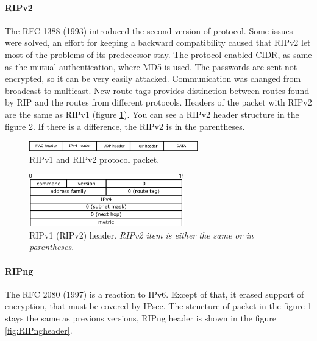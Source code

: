 \documentclass[10pt,a4paper,titlepage]{article}
\begin{document}
            \paragraph{RIPv2}
                The RFC 1388 (1993) introduced the second version of protocol. Some issues were solved, an effort for keeping
                a backward compatibility caused that RIPv2 let most of the problems of its predecessor stay. The protocol
                enabled CIDR, as same as the mutual authentication, where MD5 is used. The passwords are sent not encrypted,
                so it can be very easily attacked. Communication was changed from broadcast to multicast. New route tags
                provides distinction between routes found by RIP and the routes from different protocols. Headers of the packet
                with RIPv2 are the same as RIPv1 (figure \ref{fig:RIPheaders}). You can see a RIPv2 header structure in the figure
                \ref{fig:RIPheader}. If there is a difference, the RIPv2 is in the parentheses. \cite{RFC2453}

                \begin{figure}[h!]
                    \begin{center}
                        \includegraphics[width=0.65\textwidth]{rip_hs.png}
                        \caption{RIPv1 and RIPv2 protocol packet. \label{fig:RIPheaders}}
                    \end{center}
                \end{figure}

                \begin{figure}[h!]
                    \begin{center}
                        \includegraphics[width=0.60\textwidth]{rip_h.png}
                        \caption{RIPv1 (RIPv2) header. {\it RIPv2 item is either the same or in parentheses}. \label{fig:RIPheader}}
                    \end{center}
                \end{figure}

            \paragraph{RIPng}
                The RFC 2080 (1997) is a reaction to IPv6. Except of that, it erased support of encryption, that must be covered
                by IPsec. The structure of packet in the figure \ref{fig:RIPheaders} stays the same as previous versions,
                RIPng header is shown in the figure \ref{fig:RIPngheader}.
                \cite{RFC2080} \cite{RFC2081}
\end{document}
